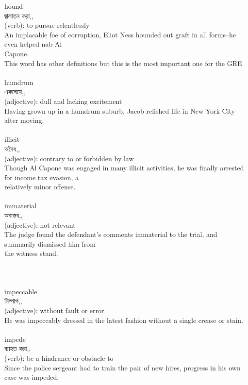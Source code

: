 \documentclass{article}
\begin{document}
{hound}\\
{জ্বালাতন করা,,}\\
{(verb): to pursue relentlessly\\An implacable foe of corruption, Eliot Ness hounded out graft in all forms--he even helped nab Al\\Capone.\\This word has other definitions but this is the most important one for the GRE\\}\\
{humdrum}\\
{একঘেয়ে,,}\\
{(adjective): dull and lacking excitement\\Having grown up in a humdrum suburb, Jacob relished life in New York City after moving.\\}\\
{illicit}\\
{অবৈধ,,}\\
{(adjective): contrary to or forbidden by law\\Though Al Capone was engaged in many illicit activities, he was finally arrested for income tax evasion, a\\relatively minor offense.\\}\\
{immaterial}\\
{অবাস্তব,,}\\
{(adjective): not relevant\\The judge found the defendant's comments immaterial to the trial, and summarily dismissed him from\\the witness stand.\\\\                                                                                \\}\\
{impeccable}\\
{নিষ্পাপ,,}\\
{(adjective): without fault or error\\He was impeccably dressed in the latest fashion without a single crease or stain.\\}\\
{impede}\\
{ব্যাহত করা,,}\\
{(verb): be a hindrance or obstacle to\\Since the police sergeant had to train the pair of new hires, progress in his own case was impeded.\\}\\
\end{document}

